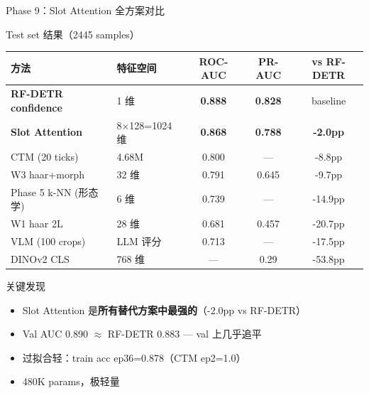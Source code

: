 \documentclass[aspectratio=169, 10pt]{beamer}
\begin{document}
\begin{frame}{Phase 9：Slot Attention 全方案对比}
  \begin{block}{Test set 结果（2445 samples）}
    \begin{tabular}{llccc}
      \toprule
      \textbf{方法} & \textbf{特征空间} & \textbf{ROC-AUC} & \textbf{PR-AUC} & \textbf{vs RF-DETR} \\
      \midrule
      \textbf{RF-DETR confidence} & 1 维 & \textbf{0.888} & \textbf{0.828} & baseline \\
      \textbf{Slot Attention} & 8$\times$128=1024 维 & \textbf{0.868} & \textbf{0.788} & \textbf{-2.0pp} \\
      CTM (20 ticks) & 4.68M & 0.800 & — & -8.8pp \\
      W3 haar+morph & 32 维 & 0.791 & 0.645 & -9.7pp \\
      Phase 5 k-NN (形态学) & 6 维 & 0.739 & — & -14.9pp \\
      W1 haar 2L & 28 维 & 0.681 & 0.457 & -20.7pp \\
      VLM (100 crops) & LLM 评分 & 0.713 & — & -17.5pp \\
      DINOv2 CLS & 768 维 & — & 0.29 & -53.8pp \\
      \bottomrule
    \end{tabular}
  \end{block}
  \vspace{0em}
  \begin{alertblock}{关键发现}
    \begin{itemize}
      \item Slot Attention 是\textbf{所有替代方案中最强的}（-2.0pp vs RF-DETR）
      \item Val AUC 0.890 $\approx$ RF-DETR 0.883 — val 上几乎追平
      \item 过拟合轻：train acc ep36=0.878（CTM ep2=1.0）
      \item 480K params，极轻量
    \end{itemize}
  \end{alertblock}
\end{frame}
\end{document}
